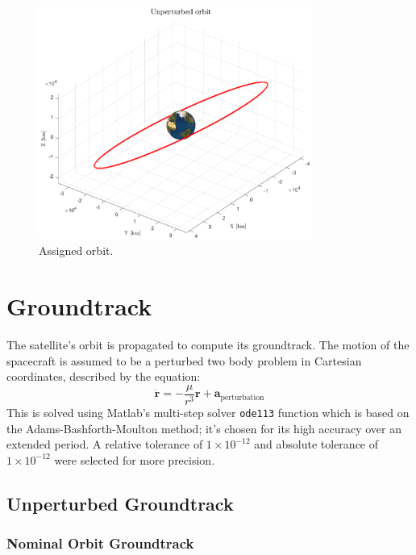 \documentclass{article}
\begin{document}
\begin{figure}[H]
	\centering
	\includegraphics[width=0.8\textwidth]{nominal_orbit.eps}
	\caption{Assigned orbit.}
	\label{fig:nominal_orbit}
\end{figure}

\section{Groundtrack}
The satellite's orbit is propagated to compute its groundtrack. The motion of the spacecraft is assumed to be a perturbed two body problem in Cartesian coordinates, described by the equation:
\[
\dot{\mathbf{r}} = -\frac{\mu}{r^3} \mathbf{r} + \mathbf{a}_{\text{perturbation}}
\]
This is solved using Matlab's multi-step solver \texttt{ode113} function which is based on the Adams-Bashforth-Moulton method; it's chosen for its high accuracy over an extended period. A relative tolerance of \(1 \times 10^{-12}\) and absolute tolerance of \(1 \times 10^{-12}\) were selected for more precision.


\subsection{Unperturbed Groundtrack}
\subsubsection{Nominal Orbit Groundtrack}
\end{document}

